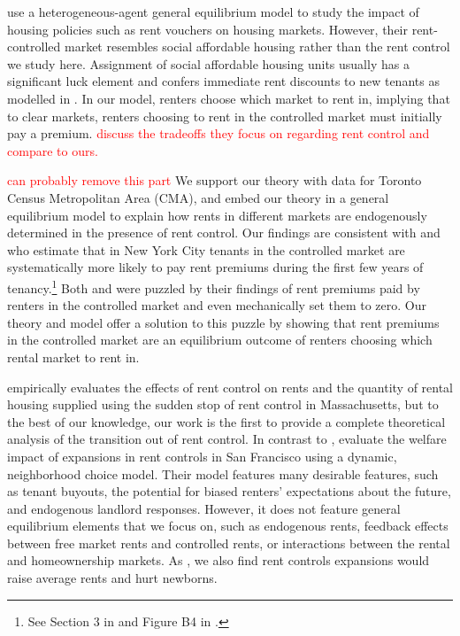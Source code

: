 \documentclass[parskip=full]{article}
\begin{document}
\citet{fmn-2022} use a heterogeneous-agent general equilibrium model to study the impact of housing policies such as rent vouchers on housing markets. However, their rent-controlled market resembles social affordable housing rather than the rent control we study here. Assignment of social affordable housing units usually has a significant luck element and confers immediate rent discounts to new tenants as modelled in \citet{fmn-2022}. In our model, renters choose which market to rent in, implying that to clear markets, renters choosing to rent in the controlled market must initially pay a premium. \textcolor{red}{discuss the tradeoffs they focus on regarding rent control and compare to ours.}

\textcolor{red}{can probably remove this part}
We support our theory with data for Toronto Census Metropolitan Area (CMA), and embed our theory in a general equilibrium model to explain how rents in different markets are endogenously determined in the presence of rent control. Our findings are consistent with \citet{early-2000} and \citet{cjq-2023} who estimate that in New York City tenants in the controlled market are systematically more likely to pay rent premiums during the first few years of tenancy.\footnote{See Section 3 in \citet{early-2000} and Figure B4 in \citet{cjq-2023}.} Both \citet{early-2000} and \citet{cjq-2023} were puzzled by their findings of rent premiums paid by renters in the controlled market and \citet{early-2000} even mechanically set them to zero. Our theory and model offer a solution to this puzzle by showing that rent premiums in the controlled market are an equilibrium outcome of renters choosing which rental market to rent in. 

\citet{sims-2007} empirically evaluates the effects of rent control on rents and the quantity of rental housing supplied using the sudden stop of rent control in Massachusetts, but to the best of our knowledge, our work is the first to provide a complete theoretical analysis of the transition out of rent control. In contrast to \citet{sims-2007}, \citet{diamond-2019} evaluate the welfare impact of expansions in rent controls in San Francisco using a dynamic, neighborhood choice model. Their model features many desirable features, such as tenant buyouts, the potential for biased renters' expectations about the future, and endogenous landlord responses. However, it does not feature general equilibrium elements that we focus on, such as endogenous rents, feedback effects between free market rents and controlled rents, or interactions between the rental and homeownership markets. As \citet{diamond-2019}, we also find rent controls expansions would raise average rents and hurt newborns.
\end{document}
